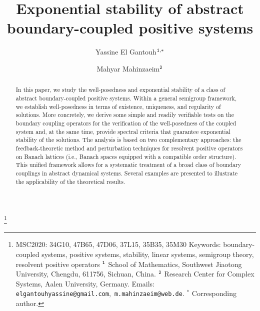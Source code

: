 \documentclass[a4paper,11pt,reqno]{amsart}
\theoremstyle{plain}
\numberwithin{equation}{section}
\begin{document}
\title{Exponential stability of abstract boundary-coupled positive systems}
\author{Yassine El Gantouh$^{\tt1,\ast}$}
\author{Mahyar Mahinzaeim$^{\tt2}$}

\thanks{
\vspace{-1em}\newline\noindent
{\sc MSC2020}: 34G10, 47B65, 47D06, 37L15, 35B35, 35M30
\newline\noindent
{\sc Keywords}: {boundary-coupled systems, positive systems, stability, linear systems, semigroup theory, resolvent positive operators}
\newline\noindent
$^{\tt1}$ School of Mathematics, Southwest Jiaotong University, Chengdu, 611756, Sichuan, China.
\newline\noindent
$^{\tt2}$ Research Center for Complex Systems, Aalen University, Germany.
\newline\noindent
{\sc Emails}:
{\tt elgantouhyassine@gmail.com},~{\tt m.mahinzaeim@web.de}.
\newline\noindent
$^{\ast}$ Corresponding author.
}


\begin{abstract}
In this paper, we study the well-posedness and exponential stability of a class of abstract boundary-coupled positive systems. Within a general semigroup framework, we establish well-posedness in terms of existence, uniqueness, and regularity of solutions. More concretely, we derive some simple and readily verifiable tests on the boundary coupling operators for the verification of the well-posedness of the coupled system and, at the same time, provide spectral criteria that guarantee exponential stability of the solutions. The analysis is based on two complementary approaches: the feedback-theoretic method and perturbation techniques for resolvent positive operators on Banach lattices (i.e., Banach spaces equipped with a compatible order structure). This unified framework allows for a systematic treatment of a broad class of boundary couplings in abstract dynamical systems. Several examples are presented to illustrate the applicability of the theoretical results.
\end{abstract}
\maketitle

\pagestyle{myheadings} \thispagestyle{plain} 
\end{document}
